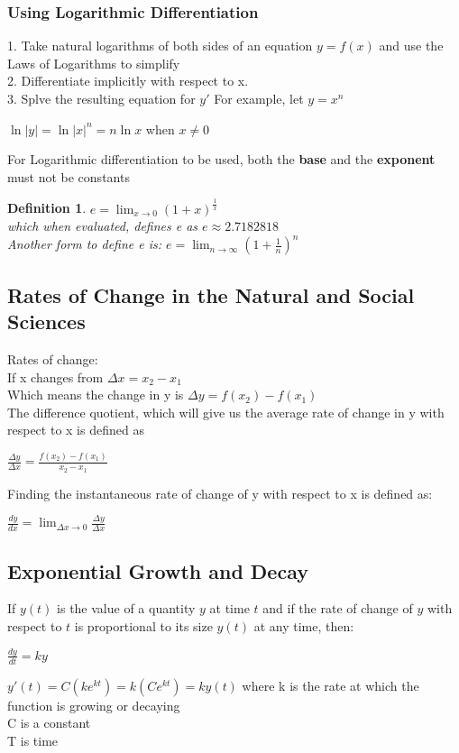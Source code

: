 \documentclass[10pt,a4paper]{article}
\newtheorem{definition}{Definition}
\begin{document}
		\subsubsection{Using Logarithmic Differentiation}
		1. Take natural logarithms of both sides of an equation $y=f(x)$ and use the Laws of Logarithms to simplify
		\\2. Differentiate implicitly with respect to x.
		\\3. Splve the resulting equation for $y'$
		For example, let $y=x^{n}$
		\begin{center}
			$\ln{|y|} = \ln{|x|^{n}}=n\ln{x}$ when $x \neq 0$
		\end{center}
		For Logarithmic differentiation to be used, both the \textbf{base} and the \textbf{exponent} must not be constants
		\begin{definition}
			$e=\lim_{x\rightarrow 0}{(1+x)^{\frac{1}{x}}}$ 
			\\which when evaluated, defines e as $e\approx 2.7182818$
			\\Another form to define e is: 
			$e=\lim_{n\rightarrow\infty}{(1+\frac{1}{n})^{n}}$
		\end{definition}
	\subsection{Rates of Change in the Natural and Social Sciences}
	Rates of change: 
	\\If x changes from $\Delta{x} = x_{2}-x_{1}$
	\\Which means the change in y is $\Delta{y} = f(x_{2})-f(x_{1})$
	\\The difference quotient, which will give us the average rate of change in y with respect to x is defined as
	\begin{center} 
		$\frac{\Delta{y}}{\Delta{x}}= \frac{f(x_{2})-f(x_{1})}{x_{2}-x_{1}}$
	\end{center}
	Finding the instantaneous rate of change of y with respect to x is defined as:
	\begin{center}
		$\frac{dy}{dx}= \lim_{\Delta{x}\rightarrow 0}{\frac{\Delta{y}}{\Delta{x}}}$
	\end{center}
	\subsection{Exponential Growth and Decay}
	If $y(t)$ is the value of a quantity $y$ at time $t$ and if the rate of change of $y$ with respect to $t$ is proportional to its size $y(t)$ at any time, then:
	\begin{center}
		$\frac{dy}{dt} = ky$
	\end{center}	
	$y'(t)=C(ke^{kt})=k(Ce^{kt})=ky(t)$
	where k is the rate at which the function is growing or decaying
	\\C is a constant
	\\T is time
\pagebreak
\end{document}
